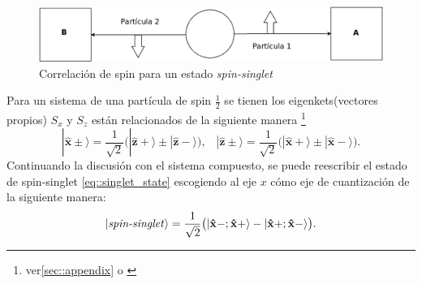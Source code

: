 \documentclass[a4paper]{article}
\begin{document}
\begin{figure}[h]
\begin{center}
\includegraphics[scale=0.27]{./spin_correlation_spin_singlet.png} 
\end{center} 
\caption{Correlación de spin para un estado \textit{spin-singlet}}
\label{fig::spin_correlation_spin_singlet}
\end{figure}
Para un sistema de una partícula de spin $\frac{1}{2}$ se tienen los  eigenkets(vectores propios) $S_x$ y $S_z$ están relacionados de la siguiente manera \footnote{ver\ref{sec::appendix} o \cite{Sakurai}}
\begin{equation}
|\mathbf{\hat{x}\pm}\rangle=\frac{1}{\sqrt{2}}\big (|\mathbf{\hat{z}+}\rangle \pm |\mathbf{\hat{z}-}\rangle  \big),\,\,\,\,\,|\mathbf{\hat{z}\pm}\rangle=\frac{1}{\sqrt{2}}\big (|\mathbf{\hat{x}+}\rangle \pm |\mathbf{\hat{x}-}\rangle  \big).
\end{equation}
Continuando la discusión con el sistema compuesto, se puede reescribir el estado de spin-singlet \ref{eq::singlet_state} escogiendo al eje $x$ cómo eje de cuantización de la siguiente manera:
\begin{equation}
|\text{\textit{spin-singlet}}\rangle=\frac{1}{\sqrt{2}}\big( |\mathbf{\hat{x}}-;\mathbf{\hat{x}}+\rangle -|\mathbf{\hat{x}}+;\mathbf{\hat{x}}-\rangle  \big).
\end{equation}
\end{document}
